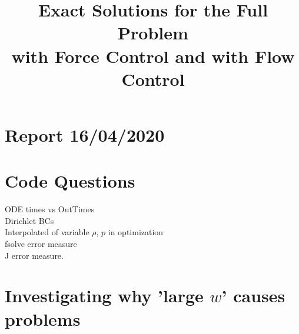 \documentclass[11pt, a4paper]{article}
\title{Exact Solutions for the Full Problem \\with Force Control and with Flow Control}
\date{}
\theoremstyle{definition}
\begin{document}
\section*{Report 16/04/2020}	
\section{Code Questions}
ODE times vs OutTimes\\
Dirichlet BCs\\
Interpolated of variable $\rho$, $p$ in optimization\\
fsolve error measure\\
J error measure.	
\section{Investigating why 'large $w$' causes problems}
\end{document}
